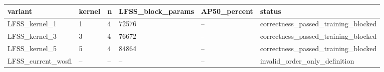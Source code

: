 \begin{tabular}{llllll}
\hline
variant & kernel & n & LFSS\_block\_params & AP50\_percent & status \\
\hline
LFSS\_kernel\_1 & 1 & 4 & 72576 & -- & correctness\_passed\_training\_blocked \\
LFSS\_kernel\_3 & 3 & 4 & 76672 & -- & correctness\_passed\_training\_blocked \\
LFSS\_kernel\_5 & 5 & 4 & 84864 & -- & correctness\_passed\_training\_blocked \\
LFSS\_current\_wosfi & -- & -- & -- & -- & invalid\_order\_only\_definition \\
\hline
\end{tabular}

